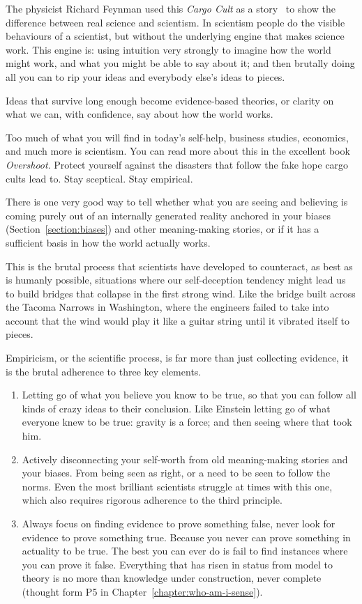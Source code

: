 The physicist Richard Feynman used this \emph{Cargo Cult} as a story~\cite{feynman-cargo-cult,meaningness-cargo-cult} to show the difference between real science and scientism. In scientism people do the visible behaviours of a scientist, but without the underlying engine that makes science work. This engine is: using intuition very strongly to imagine how the world might work, and what you might be able to say about it; and then brutally doing all you can to rip your ideas and everybody else's ideas to pieces.


Ideas that survive long enough become evidence-based theories, or clarity on what we can, with confidence, say about how the world works.


Too much of what you will find in today's self-help, business studies, economics, and much more is scientism. You can read more about this in the excellent book \emph{Overshoot}\cite{catton-overshoot}. Protect yourself against the disasters that follow the fake hope cargo cults lead to. Stay sceptical. Stay empirical.


There is one very good way to tell whether what you are seeing and believing is coming purely out of an internally generated reality anchored in your biases (Section~\ref{section:biases}) and other meaning-making stories, or if it has a sufficient basis in how the world actually works. 


This is the brutal process that scientists have developed to counteract, as best as is humanly possible, situations where our self-deception tendency might lead us to build bridges that collapse in the first strong wind. Like the bridge built across the Tacoma Narrows in Washington, where the engineers failed to take into account that the wind would play it like a guitar string until it vibrated itself to pieces.


Empiricism, or the scientific process, is far more than just collecting evidence, it is the brutal adherence to three key elements.


\begin{enumerate}
\item Letting go of what you believe you know to be true, so that you can follow all kinds of crazy ideas to their conclusion. Like Einstein letting go of what everyone knew to be true: gravity is a force; and then seeing where that took him.
\item Actively disconnecting your self-worth from old meaning-making stories and your biases. From being seen as right, or a need to be seen to follow the norms. Even the most brilliant scientists struggle at times with this one, which also requires rigorous adherence to the third principle.
\item  Always focus on finding evidence to prove something false, never look for evidence to prove something true. Because you never can prove something in actuality to be true. The best you can ever do is fail to find instances where you can prove it false. Everything that has risen in status from model to theory is no more than knowledge under construction, never complete (thought form P5 in Chapter~\ref{chapter:who-am-i-sense}).
\end{enumerate}


